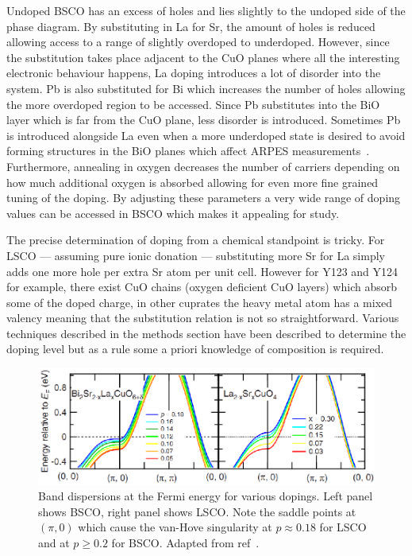 Undoped \ac{BSCO} has an excess of holes and lies slightly to the undoped side of the phase diagram. By substituting in La for Sr, the amount of holes is reduced allowing access to a range of slightly overdoped to underdoped. However, since the substitution takes place adjacent to the CuO planes where all the interesting electronic behaviour happens, La doping introduces a lot of disorder into the system. Pb is also substituted for Bi which increases the number of holes allowing the more overdoped region to be accessed. Since Pb substitutes into the BiO layer which is far from the CuO plane, less disorder is introduced. Sometimes Pb is introduced alongside La even when a more underdoped state is desired to avoid forming structures in the BiO planes which affect \ac{ARPES} measurements~\cite{Kondo2007}. Furthermore, annealing in oxygen decreases the number of carriers depending on how much additional oxygen is absorbed allowing for even more fine grained tuning of the doping. By adjusting these parameters a very wide range of doping values can be accessed in \ac{BSCO} which makes it appealing for study.

The precise determination of doping from a chemical standpoint is tricky. For \ac{LSCO} --- assuming pure ionic donation --- substituting more Sr for La simply adds one more hole per extra Sr atom per unit cell. However for \ac{Y123} and \ac{Y124} for example, there exist CuO chains (oxygen deficient CuO layers) which absorb some of the doped charge, in other cuprates the heavy metal atom has a mixed valency meaning that the substitution relation is not so straightforward. Various techniques described in the methods section have been described to determine the doping level but as a rule some a priori knowledge of composition is required.
\begin{figure}[htbp]
    \begin{center}
        \includegraphics[scale=1.0]{Chapter-Introduction/Figures/VanHoveBSCOLSCO/VanHoveBSCOLSCO}
        \caption{Band dispersions at the Fermi energy for various dopings. Left panel shows \ac{BSCO}, right panel shows \ac{LSCO}. Note the saddle points at $(\pi, 0)$ which cause the van-Hove singularity at $p\approx 0.18$ for \ac{LSCO} and at $p \geq 0.2$ for \ac{BSCO}. Adapted from ref~\cite{Hashimoto2008}.}
        \label{Fig:Intro:VanHoveBSCOLSCO}
    \end{center}
\end{figure}

